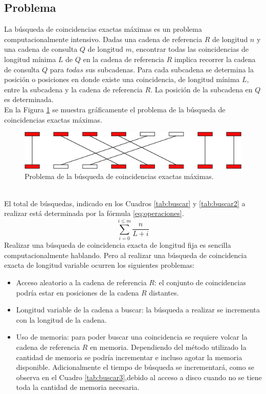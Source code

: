 \documentclass[11pt,a4paper,english]{article}
\begin{document}
\subsection*{Problema}
La búsqueda de coincidencias exactas máximas es un problema computacionalmente
intensivo. Dadas una cadena de referencia $R$ de longitud $n$ y una cadena de consulta 
$Q$ de longitud $m$, encontrar todas las coincidencias de longitud mínima $L$ de $Q$
en la cadena de referencia $R$ implica recorrer la cadena de consulta $Q$ para $todas$
sus subcadenas. Para cada subcadena se determina la posición o posiciones en donde 
existe una coincidencia, de longitud mínima $L$, entre la subcadena y la cadena de 
referencia $R$. La posición de la subcadena en $Q$ es determinada.\\
En la Figura \ref{fig:problema} se muestra gráficamente el problema de la búsqueda
de coincidencias exactas máximas.
\begin{figure}[h]
\begin{center}
\includegraphics[scale=0.5]{gaps.png}
\caption{Problema de la búsqueda de coincidencias exactas máximas.}
\label{fig:problema}
\end{center}
\end{figure}
\\ \indent El total de búsquedas, indicado en los Cuadros \ref{tab:buscar} y \ref{tab:buscar2} 
a realizar está determinada por la fórmula \ref{eq:operaciones}.
\begin{equation}
  \sum_{i=0}^{i\le m}{\frac{n}{L+i}}
  \label{eq:operaciones}
\end{equation}
Realizar una búsqueda de coincidencia exacta de longitud fija es sencilla 
computacionalmente hablando. Pero al realizar una búsqueda de coincidencia exacta de 
longitud variable ocurren los siguientes problemas:
\begin{itemize}
  \item Acceso aleatorio a la cadena de referencia $R$: el conjunto de coincidencias
    podría estar en posiciones de la cadena $R$ distantes.
  \item Longitud variable de la cadena a buscar: la búsqueda a realizar se incrementa
    con la longitud de la cadena.
  \item Uso de memoria: para poder buscar una coincidencia se requiere volcar la 
    cadena de referencia $R$ en memoria. Dependiendo del método utilizado la 
    cantidad de memoria se podría incrementar e incluso agotar la memoria disponible.
    Adicionalmente el tiempo de búsqueda se incrementará, como se observa en el 
    Cuadro \ref{tab:buscar3},debido al acceso a disco cuando no se tiene toda la 
    cantidad de memoria necesaria.
\end{itemize}
\end{document}

